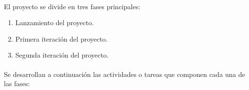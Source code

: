 \paragraph{} El proyecto se divide en tres fases principales:
\begin{enumerate}
	\item Lanzamiento del proyecto.
	\item Primera iteración del proyecto.
	\item Segunda iteración del proyecto.
\end{enumerate}

\paragraph{} Se desarrollan a continuación las actividades o tareas que componen cada una de las fases:
